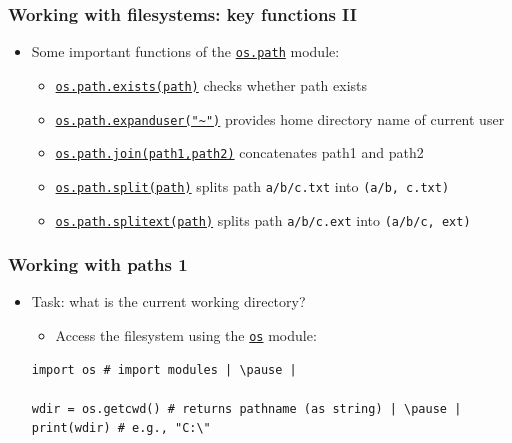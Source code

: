 \documentclass[xcolor=table]{beamer}
\begin{document}
\begin{frame}[fragile]
    \frametitle{Working with filesystems: key functions II}
        \begin{itemize}\addtolength{\itemsep}{\baselineskip}
            \item Some important functions of the \href{https://docs.python.org/3.7/library/os.html#module-os.path}{\texttt{os.path}} module:\pause
                \begin{itemize}\addtolength{\itemsep}{\baselineskip}
                        \item \href{https://docs.python.org/3.7/library/os.path.html#os.path.exists}{\texttt{os.path.exists(path)}} checks whether path exists \pause
                        \item \href{https://docs.python.org/3.7/library/os.path.html#os.path.expanduser}{\texttt{os.path.expanduser("\textasciitilde")}} provides home directory name of current user \pause
                        \item \href{https://docs.python.org/3.7/library/os.path.html#os.path.join}{\texttt{os.path.join(path1,path2)}} concatenates path1 and path2  \pause
                        \item \href{https://docs.python.org/3.7/library/os.path.html#os.path.split}{\texttt{os.path.split(path)}} splits path \texttt{a/b/c.txt} into \texttt{(a/b, c.txt)} \pause
                        \item \href{https://docs.python.org/3.7/library/os.path.html#os.path.splitext}{\texttt{os.path.splitext(path)}} splits path \texttt{a/b/c.ext} into \texttt{(a/b/c, ext)} \pause
                \end{itemize}
        \end{itemize}
\end{frame}



\begin{frame}[fragile]
    \frametitle{Working with paths 1}
    \begin{itemize}
        \item Task: what is the current working directory? 
            \begin{itemize}
                \item Access the filesystem using the \href{https://docs.python.org/3.7/library/os.html#module-os}{\texttt{os}} module: \pause
            \end{itemize}
\begin{lstlisting}[style=python]
import os # import modules | \pause |

wdir = os.getcwd() # returns pathname (as string) | \pause |
print(wdir) # e.g., "C:\" 
\end{lstlisting}
    \end{itemize}
\end{frame}
\end{document}
